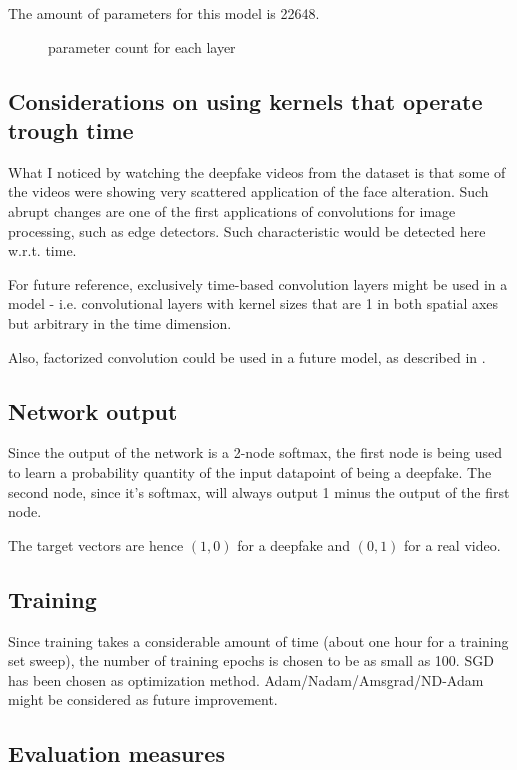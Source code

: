 The amount of parameters for this model is 22648.

\begin{figure}[h]
\caption{parameter count for each layer}
\centering

\end{figure}

\subsection{Considerations on using kernels that operate trough time}

What I noticed by watching the deepfake videos from the dataset is that some
of the videos were showing very scattered application of the face alteration.
Such abrupt changes are one of the first applications of convolutions for
image processing, such as edge detectors. Such characteristic would be 
detected here w.r.t. time.

For future reference, exclusively time-based convolution layers might be used
in a model - i.e. convolutional layers with kernel sizes that are 1 in both spatial
axes but arbitrary in the time dimension.

Also, factorized convolution could be used in a future model, as described in \cite{Burlacu}.

\subsection{Network output}

Since the output of the network is a 2-node softmax,
the first node is being used to learn a probability quantity of the input datapoint 
of being a deepfake. The second node, since it's softmax, will always output
1 minus the output of the first node.

The target vectors are hence $(1,0)$ for a deepfake and $(0,1)$ for a real video.

\subsection{Training}
Since training takes a considerable amount of time (about one hour for a training set
sweep), the number of training epochs is chosen to be as small as 100.
SGD has been chosen as optimization method. Adam/Nadam/Amsgrad/ND-Adam might be considered
as future improvement.

\subsection{Evaluation measures}

